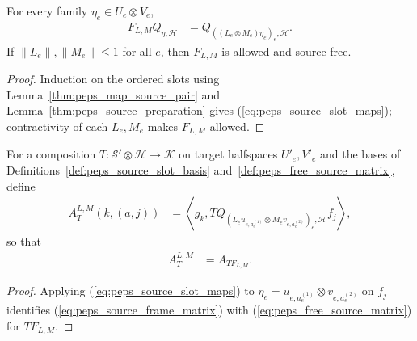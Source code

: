 \begin{lemma}
    \label{thm:peps_source_slot_maps}
    \leanok
    For every family $\eta_e\in U_e\otimes V_e$,
    \begin{align}
        F_{L,M}Q_{\eta,\mathcal H}
         & =Q_{((L_e\otimes M_e)\eta_e)_e,\mathcal H}.
        \label{eq:peps_source_slot_maps}
    \end{align}
    If $\|L_e\|,\|M_e\|\le1$ for all $e$, then $F_{L,M}$ is allowed and
    source-free.
\end{lemma}

\begin{proof}\leanok
    Induction on the ordered slots using Lemma~\ref{thm:peps_map_source_pair}
    and Lemma~\ref{thm:peps_source_preparation} gives
    (\ref{eq:peps_source_slot_maps}); contractivity of each $L_e,M_e$ makes
    $F_{L,M}$ allowed.
\end{proof}

\begin{definition}
    \label{def:peps_source_frame_matrix}
    \leanok
    For a composition $T:\mathcal S'\otimes\mathcal H\to\mathcal K$ on target
    halfspaces $U'_e,V'_e$ and the bases of
    Definitions~\ref{def:peps_source_slot_basis} and~\ref{def:peps_free_source_matrix},
    define
    \begin{align}
        A_T^{L,M}(k,(a,j))
         & =\left\langle g_k,
        TQ_{(L_eu_{e,a_e^{(1)}}\otimes
                M_ev_{e,a_e^{(2)}})_e,\mathcal H}f_j\right\rangle,
        \label{eq:peps_source_frame_matrix}
    \end{align}
    so that
    \begin{align}
        A_T^{L,M} & =A_{TF_{L,M}}.
        \label{eq:peps_source_frame_matrix_composition}
    \end{align}
\end{definition}

\begin{proof}\leanok
    Applying (\ref{eq:peps_source_slot_maps}) to
    $\eta_e=u_{e,a_e^{(1)}}\otimes v_{e,a_e^{(2)}}$ on $f_j$ identifies
    (\ref{eq:peps_source_frame_matrix}) with (\ref{eq:peps_free_source_matrix})
    for $TF_{L,M}$.
\end{proof}

